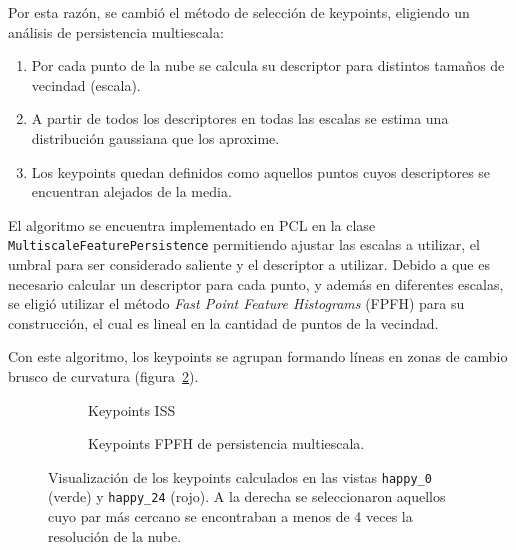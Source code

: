 			Por esta razón, se cambió el método de selección de keypoints,
			eligiendo un análisis de persistencia multiescala:
			\begin{enumerate}
				\item Por cada punto de la nube se calcula su descriptor para distintos tamaños de vecindad (escala).
				\item A partir de todos los descriptores en todas las escalas se estima una distribución gaussiana que los aproxime.
				\item Los keypoints quedan definidos como aquellos puntos cuyos descriptores se encuentran alejados de la media\cite{Rusu:2009:FPF:1703435.1703733}.
			\end{enumerate}
			El algoritmo se encuentra implementado en PCL en la clase
			\texttt{Multiscale\-Feature\-Persistence} permitiendo ajustar las
			escalas a utilizar, el umbral para ser considerado saliente y el descriptor a utilizar.
			Debido a que es necesario calcular un descriptor para cada punto, y
			además en diferentes escalas, se eligió utilizar el método
			\emph{Fast Point Feature Histograms} (FPFH) para su construcción,
			el cual es lineal en la cantidad de puntos de la vecindad.

			Con este algoritmo, los keypoints se agrupan formando líneas en zonas de cambio brusco de curvatura (figura~\ref{fig:multiscale_key}).


			\begin{figure}
				\centering
				\begin{subfigure}{\linewidth}
					\caption[Keypoints ISS]{\label{fig:iss_key}Keypoints ISS}
				\end{subfigure}

				\begin{subfigure}{\linewidth}
					\caption[Keypoints FPFH de persistencia multiescala]{\label{fig:multiscale_key}Keypoints FPFH de persistencia multiescala.}
				\end{subfigure}
				\caption[Visualización de los keypoints]{\label{fig:keypoints}Visualización de los keypoints calculados en las vistas
					\texttt{happy\_0} (verde) y \texttt{happy\_24} (rojo).
					A la derecha se seleccionaron aquellos cuyo par
					más cercano se encontraban a menos de 4 veces la resolución
					de la nube.}
			\end{figure}



